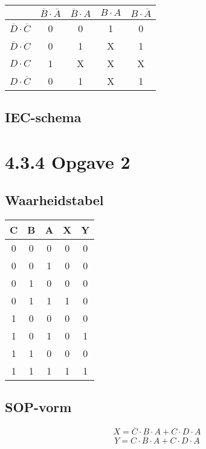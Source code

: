 \documentclass[11pt, a4paper]{report}
\begin{document}
\begin{tabular}{c | c | c | c | c |}
   & $\overline{B} \cdot \overline{A}$ & $\overline{B} \cdot A$ & $B \cdot A$ & $B \cdot \overline{A}$ \\
   \hline
   $\overline{D} \cdot \overline{C}$ &  0 & 0 & 1 & 0 \\
   \hline
   $\overline{D} \cdot C$ &  0 & 1 & X & 1 \\
   \hline
    $D \cdot C$ &  1 & X & X & X \\
   \hline
    $D \cdot \overline{C}$ &  0 & 1 & X & 1 \\
    \hline
\end{tabular}

\subsection*{IEC-schema}

\vspace{5 cm}

\section*{4.3.4 Opgave 2}

\subsection*{Waarheidstabel}

\begin{tabular}{| c c c || c || c |}
  \hline
  C & B & A & X & Y  \\
  \hline
  0 & 0 & 0 & 0 & 0 \\
  0 & 0 & 1 & 0 & 0 \\
  0 & 1 & 0 & 0 & 0 \\
  0 & 1 & 1 & 1 & 0 \\
  \hline
  1 & 0 & 0 & 0 & 0 \\
  1 & 0 & 1 & 0 & 1 \\
  1 & 1 & 0 & 0 & 0 \\
  1 & 1 & 1 & 1 & 1 \\
  \hline
\end{tabular}
\newpage
\subsection*{SOP-vorm}

\begin{equation*}
  X = \overline{C} \cdot B \cdot A + C\cdot D\cdot A
\end{equation*}
\begin{equation*}
  Y = C \cdot \overline{B} \cdot A + C\cdot D\cdot A
\end{equation*}
\end{document}

